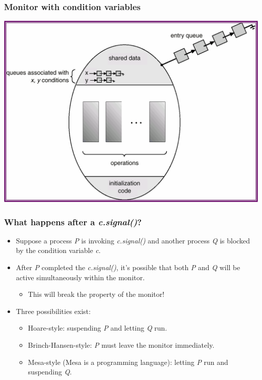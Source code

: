 \documentclass[CJKutf8,xcolor=pdftex,dvipsnames,table]{beamer}
\begin{document}
\begin{CJK*}{UTF8}{song}
  \begin{frame}
  \frametitle{Monitor with condition variables} \pause
  \begin{center}
    \includegraphics[scale=.5]{v6f7-21}
  \end{center}
  \end{frame}

  \begin{frame}
  \frametitle{What happens after a \emph{c.signal()}?} \pause
  \begin{itemize}
  \item{Suppose a process \emph{P} is invoking \emph{c.signal()} and another
    process \emph{Q} is blocked by the condition variable \emph{c}.} \pause
  \item{After \emph{P} completed the \emph{c.signal()}, it's possible that
    both \emph{P} and \emph{Q} will be active simultaneously within the monitor.} \pause
    \begin{itemize}
    \item{This will break the property of the monitor!} \pause
    \end{itemize}
  \item{Three possibilities exist:} \pause
    \begin{itemize}
    \item{Hoare-style: suspending \emph{P} and letting \emph{Q} run.} \pause
    \item{Brinch-Hansen-style: \emph{P} must leave the monitor immediately.} \pause
    \item{Mesa-style (Mesa is a programming language): letting \emph{P} run and suspending \emph{Q}.}
    \end{itemize}
  \end{itemize}
  \end{frame}


\end{CJK*}
\end{document}
